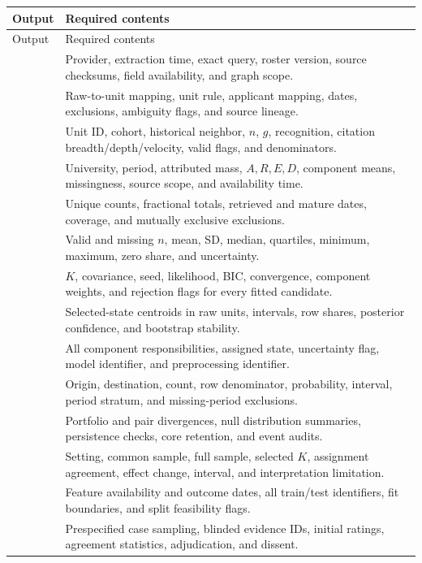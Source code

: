 \begin{longtable}{P{4.35cm}P{9.4cm}}
\toprule
Output & Required contents\\\midrule\endfirsthead
\toprule Output & Required contents\\\midrule\endhead
{} & Provider, extraction time, exact query, roster version, source checksums, field availability, and graph scope.\\
 & Raw-to-unit mapping, unit rule, applicant mapping, dates, exclusions, ambiguity flags, and source lineage.\\
 & Unit ID, cohort, historical neighbor, $n$, $g$, recognition, citation breadth/depth/velocity, valid flags, and denominators.\\
 & University, period, attributed mass, $A,R,E,D$, component means, missingness, source scope, and availability time.\\
 & Unique counts, fractional totals, retrieved and mature dates, coverage, and mutually exclusive exclusions.\\
 & Valid and missing $n$, mean, SD, median, quartiles, minimum, maximum, zero share, and uncertainty.\\
 & $K$, covariance, seed, likelihood, BIC, convergence, component weights, and rejection flags for every fitted candidate.\\
 & Selected-state centroids in raw units, intervals, row shares, posterior confidence, and bootstrap stability.\\
 & All component responsibilities, assigned state, uncertainty flag, model identifier, and preprocessing identifier.\\
 & Origin, destination, count, row denominator, probability, interval, period stratum, and missing-period exclusions.\\
 & Portfolio and pair divergences, null distribution summaries, persistence checks, core retention, and event audits.\\
 & Setting, common sample, full sample, selected $K$, assignment agreement, effect change, interval, and interpretation limitation.\\
 & Feature availability and outcome dates, all train/test identifiers, fit boundaries, and split feasibility flags.\\
 & Prespecified case sampling, blinded evidence IDs, initial ratings, agreement statistics, adjudication, and dissent.\\
\bottomrule
\end{longtable}

